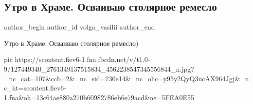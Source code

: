 
 
 
 
 
 
\subsection{Утро в Храме. Осваиваю столярное ремесло}
\label{sec:25_11_2020.fb.volga_vasilii.1.utro_v_hrame}
\ifcmt
	author_begin
   author_id volga_vasilii
	author_end
\fi

Утро в Храме.  Осваиваю столярное ремесло)

\ifcmt
pic https://scontent.fiev6-1.fna.fbcdn.net/v/t1.0-9/127449340_2761349137515834_4562238547345556844_n.jpg?_nc_cat=107&ccb=2&_nc_sid=730e14&_nc_ohc=y95y2QyQ3ucAX964Jgj&_nc_ht=scontent.fiev6-1.fna&oh=13c64ae880a270b60982786eb6e79acd&oe=5FEA0E55
\fi
